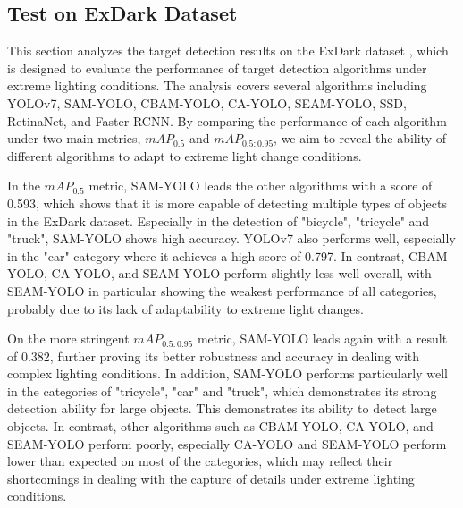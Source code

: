 \documentclass[aic]{iosart2x}
\begin{document}
\subsection{Test on ExDark Dataset}\begin{figure}
    \centering
\end{figure}

This section analyzes the target detection results on the ExDark dataset \cite{Exdark}, which is designed to evaluate the performance of target detection algorithms under extreme lighting conditions. The analysis covers several algorithms including YOLOv7, SAM-YOLO, CBAM-YOLO, CA-YOLO, SEAM-YOLO, SSD, RetinaNet, and Faster-RCNN. By comparing the performance of each algorithm under two main metrics, $mAP_{0.5}$ and $mAP_{0.5:0.95}$, we aim to reveal the ability of different algorithms to adapt to extreme light change conditions.


In the $mAP_{0.5}$ metric, SAM-YOLO leads the other algorithms with a score of 0.593, which shows that it is more capable of detecting multiple types of objects in the ExDark dataset. Especially in the detection of "bicycle", "tricycle" and "truck", SAM-YOLO shows high accuracy. YOLOv7 also performs well, especially in the "car" category where it achieves a high score of 0.797. In contrast, CBAM-YOLO, CA-YOLO, and SEAM-YOLO perform slightly less well overall, with SEAM-YOLO in particular showing the weakest performance of all categories, probably due to its lack of adaptability to extreme light changes.


On the more stringent $mAP_{0.5:0.95}$ metric, SAM-YOLO leads again with a result of 0.382, further proving its better robustness and accuracy in dealing with complex lighting conditions. In addition, SAM-YOLO performs particularly well in the categories of "tricycle", "car" and "truck", which demonstrates its strong detection ability for large objects. This demonstrates its ability to detect large objects. In contrast, other algorithms such as CBAM-YOLO, CA-YOLO, and SEAM-YOLO perform poorly, especially CA-YOLO and SEAM-YOLO perform lower than expected on most of the categories, which may reflect their shortcomings in dealing with the capture of details under extreme lighting conditions.
\end{document}
